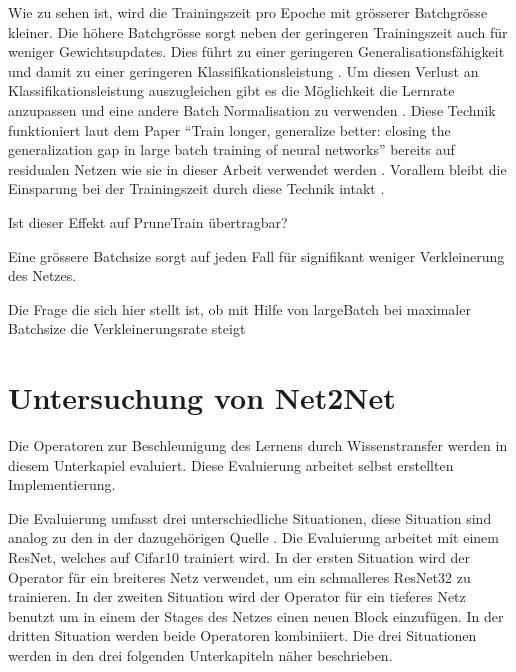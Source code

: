 Wie zu sehen ist, wird die Trainingszeit pro Epoche mit grösserer Batchgrösse kleiner. Die höhere Batchgrösse sorgt neben der geringeren Trainingszeit auch für weniger Gewichtsupdates. Dies führt zu einer geringeren Generalisationsfähigkeit und damit zu einer geringeren Klassifikationsleistung \cite{largeBatch}. Um diesen Verlust an Klassifikationsleistung auszugleichen gibt es die Möglichkeit die Lernrate anzupassen und eine andere Batch Normalisation zu verwenden \cite{largeBatch}. Diese Technik funktioniert laut dem Paper "`Train longer, generalize better: closing the generalization gap in large batch training of neural networks"' bereits auf residualen Netzen wie sie in dieser Arbeit verwendet werden \cite{largeBatch}. Vorallem bleibt die Einsparung bei der Trainingszeit durch diese Technik intakt \cite{largeBatch}.

Ist dieser Effekt auf PruneTrain übertragbar?


Eine grössere Batchsize sorgt auf jeden Fall für signifikant weniger Verkleinerung des Netzes.

Die Frage die sich hier stellt ist, ob mit Hilfe von largeBatch bei maximaler Batchsize die Verkleinerungsrate steigt  





\section{Untersuchung von Net2Net}\label{sec:net2netexperimente}
\color{blue1}
Die Operatoren zur Beschleunigung des Lernens durch Wissenstransfer werden in diesem Unterkapiel evaluiert. Diese Evaluierung arbeitet selbst erstellten Implementierung.

Die Evaluierung umfasst drei unterschiedliche Situationen, diese Situation sind analog zu den in der dazugehörigen Quelle \cite{net2net}. Die Evaluierung arbeitet mit einem ResNet, welches auf Cifar10 trainiert wird. In der ersten Situation wird der Operator für ein breiteres Netz verwendet, um ein schmalleres ResNet32 zu trainieren. In der zweiten Situation wird der Operator für ein tieferes Netz benutzt um in einem der Stages des Netzes einen neuen Block einzufügen. In der dritten Situation werden beide Operatoren kombiniiert.
Die drei Situationen werden in den drei folgenden Unterkapiteln näher beschrieben.

